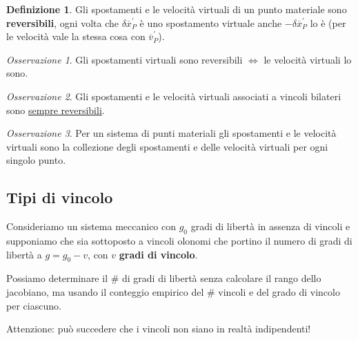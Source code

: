 \documentclass{book}
\theoremstyle{plain}
\theoremstyle{plain}
\theoremstyle{plain}
\theoremstyle{plain}
\theoremstyle{plain}
\theoremstyle{definition}
\newtheorem{defi}{Definizione}[chapter]
\theoremstyle{remark}
\newtheorem*{oss}{Osservazione}
\theoremstyle{definition}
\begin{document}
\begin{defi}
    Gli spostamenti e le velocità virtuali di un punto materiale sono \textbf{reversibili}, ogni volta che $\delta\overline{x}_{P}^{\prime}$ è uno spostamento virtuale anche $-\delta\overline{x}_{P}^{\prime}$ lo è (per le velocità vale la stessa cosa con $\overline{v}_{P}^{\prime}$).
\end{defi}

\begin{oss}
    Gli spostamenti virtuali sono reversibili $\iff$ le velocità virtuali lo sono.
\end{oss}

\begin{oss}
    Gli spostamenti e le velocità virtuali associati a vincoli bilateri sono \underline{sempre reversibili}.
\end{oss}

\begin{oss}
    Per un sistema di punti materiali gli spostamenti e le velocità virtuali sono la collezione degli spostamenti e delle velocità virtuali per ogni singolo punto.
\end{oss}

\subsection{Tipi di vincolo}

Consideriamo un sistema meccanico con $g_0$ gradi di libertà in assenza di vincoli e supponiamo che sia sottoposto a vincoli olonomi che portino il numero di gradi di libertà a $g=g_0-v$, con $v$ \textbf{gradi di vincolo}.

\noindent Possiamo determinare il \# di gradi di libertà senza calcolare il rango dello jacobiano, ma usando il conteggio empirico del \# vincoli e del grado di vincolo per ciascuno.

\noindent Attenzione: può succedere che i vincoli non siano in realtà indipendenti!
\end{document}
